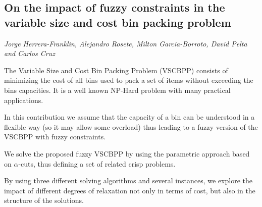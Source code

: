 \documentclass[../booklet.tex]{subfiles}
\begin{document}
\subsection[On the impact of fuzzy constraints in the variable size and cost bin packing problem. {\it Jorge Herrera-Franklin, Alejandro Rosete, Milton Garcia-Borroto, David Pelta and Carlos Cruz}]{On the impact of fuzzy constraints in the variable size and cost bin packing problem}
    

\begin{center}
  {\it Jorge Herrera-Franklin, Alejandro Rosete, Milton Garcia-Borroto, David Pelta and Carlos Cruz}
\end{center}

\vskip 0.8cm


The Variable Size and Cost Bin Packing Problem (VSCBPP) consists of minimizing the cost of all bins used to pack a set of items without exceeding the bins capacities.
It is a well known NP-Hard problem with many practical applications.

In this contribution we assume that the capacity of a bin can be understood in a flexible way (so it may allow some overload) thus leading to a fuzzy version of the VSCBPP with fuzzy constraints.


We solve the proposed fuzzy VSCBPP by using the parametric approach based on $\alpha$-cuts, thus defining a set of related crisp problems.

By using three different solving algorithms and several instances, we explore the impact of different degrees of relaxation not only in terms of cost, but also in the structure of the solutions.


\end{document}
